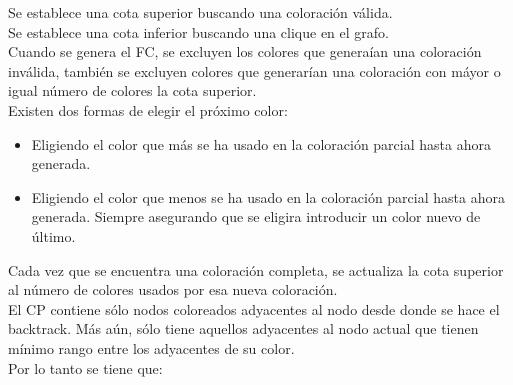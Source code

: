 \documentclass[a4paper,10pt]{article}
\begin{document}
\indent Se establece una cota superior buscando una coloraci\'on
v\'alida.\\
\indent Se establece una cota inferior buscando una clique en el grafo.\\
\indent Cuando se genera el FC, se excluyen los colores que genera\'ian
una coloraci\'on inv\'alida, tambi\'en se excluyen colores que
generar\'ian una coloraci\'on con m\'ayor o igual n\'umero de colores
la cota superior.\\
\indent Existen dos formas de elegir el pr\'oximo color:
\begin{itemize}
 \item Eligiendo el color que m\'as se ha usado en la coloraci\'on
       parcial hasta ahora generada.
 \item Eligiendo el color que menos se ha usado en la coloraci\'on
       parcial hasta ahora generada. Siempre asegurando que se eligira
       introducir un color nuevo de \'ultimo.
\end{itemize}
\indent Cada vez que se encuentra una coloraci\'on completa, se
actualiza la cota superior al n\'umero de colores usados por esa nueva
coloraci\'on.\\
\indent El CP contiene s\'olo nodos coloreados adyacentes al nodo desde
donde se hace el backtrack. M\'as a\'un, s\'olo tiene aquellos
adyacentes al nodo actual que tienen m\'inimo rango entre los adyacentes
de su color.\\
Por lo tanto se tiene que:
\end{document}
